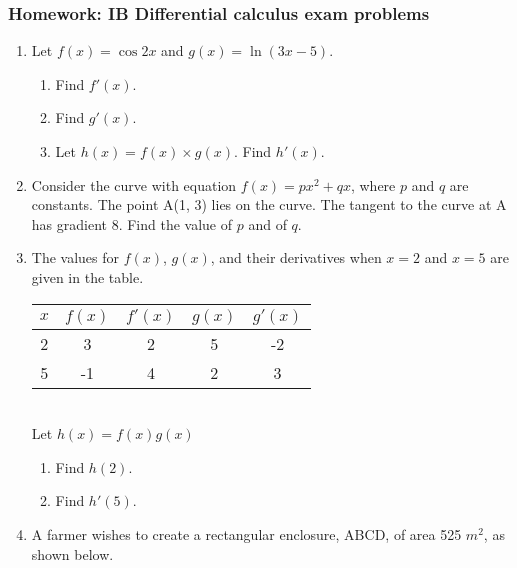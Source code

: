 \documentclass[12pt, twoside]{article}
\begin{document}
\subsubsection*{Homework: IB Differential calculus exam problems}

\begin{enumerate}

\item Let $f(x)=\cos 2x$ and $g(x)=\ln (3x-5)$.
\begin{enumerate}
  \item Find $f'(x)$.
  \item Find $g'(x)$.
  \item Let $h(x) = f(x) \times g(x)$. Find $h'(x)$.
\end{enumerate}

\item Consider the curve with equation $f(x) = px^2 + qx$, where $p$ and $q$ are constants. The point A(1, 3) lies on the curve. The tangent to the curve at A has gradient 8. Find the value of $p$ and of $q$.

\item The values for $f(x)$, $g(x)$, and their derivatives when $x=2$ and $x=5$ are given in the table. \\[0.5cm]
\begin{tabular}{|c|c|c|c|c|}
  \hline
  $x$ & $f(x)$ & $f'(x)$ & $g(x)$ & $g'(x)$ \\
  \hline
  2 & 3 & 2 & 5 & -2 \\
  \hline
  5 & -1 & 4 & 2 & 3 \\
  \hline
\end{tabular}\\[0.5cm]
Let $h(x)=f(x)g(x)$
\begin{enumerate}
  \item Find $h(2)$.
  \item Find $h'(5)$.
\end{enumerate}


\item A farmer wishes to create a rectangular enclosure, ABCD, of area 525 $m^2$, as shown below.

  \begin{figure}[!htbp]
  \begin{center}
\end{center}
\end{figure}
\end{enumerate}
\end{document}
